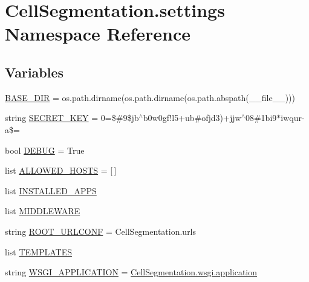 \hypertarget{namespace_cell_segmentation_1_1settings}{}\section{Cell\+Segmentation.\+settings Namespace Reference}
\label{namespace_cell_segmentation_1_1settings}
\subsection*{Variables}
\begin{DoxyCompactItemize}
\item 
\mbox{\hyperlink{namespace_cell_segmentation_1_1settings_a354c3e9bde5b55650a0e821028acf8c2}{B\+A\+S\+E\+\_\+\+D\+IR}} = os.\+path.\+dirname(os.\+path.\+dirname(os.\+path.\+abspath(\+\_\+\+\_\+file\+\_\+\+\_\+)))
\item 
string \mbox{\hyperlink{namespace_cell_segmentation_1_1settings_a2b895f9bfae7ccf648a88cc8c31c9be0}{S\+E\+C\+R\+E\+T\+\_\+\+K\+EY}} = \textquotesingle{}0=\$\#9\$jb$^\wedge$b0w0gf!l5+ub\#ofjd3)+jjw$^\wedge$08\#1bi9$\ast$iwqur-\/a\$=\textquotesingle{}
\item 
bool \mbox{\hyperlink{namespace_cell_segmentation_1_1settings_a787047027345638dd2b9ff2df7c1dac6}{D\+E\+B\+UG}} = True
\item 
list \mbox{\hyperlink{namespace_cell_segmentation_1_1settings_aa1860414aa297264b68c5d9de3c0bb3e}{A\+L\+L\+O\+W\+E\+D\+\_\+\+H\+O\+S\+TS}} = \mbox{[}$\,$\mbox{]}
\item 
list \mbox{\hyperlink{namespace_cell_segmentation_1_1settings_a3724321f33b3f6dd16253ddddffa7d9e}{I\+N\+S\+T\+A\+L\+L\+E\+D\+\_\+\+A\+P\+PS}}
\item 
list \mbox{\hyperlink{namespace_cell_segmentation_1_1settings_a9d3647228b19e6473eb9573388ea2c04}{M\+I\+D\+D\+L\+E\+W\+A\+RE}}
\item 
string \mbox{\hyperlink{namespace_cell_segmentation_1_1settings_a0ad4c6f092c3f89b3a1cdc675dd6c1f8}{R\+O\+O\+T\+\_\+\+U\+R\+L\+C\+O\+NF}} = \textquotesingle{}Cell\+Segmentation.\+urls\textquotesingle{}
\item 
list \mbox{\hyperlink{namespace_cell_segmentation_1_1settings_a55ce1528bb9c3565782c70900d419bfb}{T\+E\+M\+P\+L\+A\+T\+ES}}
\item 
string \mbox{\hyperlink{namespace_cell_segmentation_1_1settings_a2d4d22757140f5683fc58773f5411d93}{W\+S\+G\+I\+\_\+\+A\+P\+P\+L\+I\+C\+A\+T\+I\+ON}} = \textquotesingle{}\mbox{\hyperlink{namespace_cell_segmentation_1_1wsgi_ae09dc9003f187d25053773e22660fb2a}{Cell\+Segmentation.\+wsgi.\+application}}\textquotesingle{}

\end{DoxyCompactItemize}
